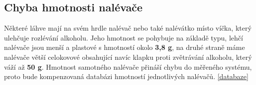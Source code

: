 \subsection{Chyba hmotnosti nalévače}
Některé láhve mají na svém hrdle nalévač nebo také nalévátko místo víčka, který ulehčuje rozlévání alkoholu. Jeho hmotnost se pohybuje na základě typu, lehčí nalévače jsou menší a plastové s hmotností okolo \textbf{3,8 g}, na druhé straně máme nalévače větší celokovové obsahující navíc klapku proti zvětrávání alkoholu, který váží až \textbf{50 g}. Hmotnost samotného nalévače přináší chybu do měřeného systému, proto bude kompenzovaná databázi hmotností jednotlivých nalévačů. \ref{databaze} %


